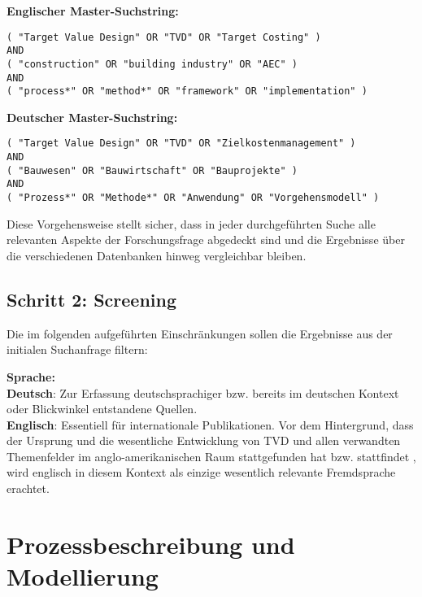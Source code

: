 \textbf{Englischer Master-Suchstring:}
\begin{verbatim}
( "Target Value Design" OR "TVD" OR "Target Costing" )
AND
( "construction" OR "building industry" OR "AEC" )
AND
( "process*" OR "method*" OR "framework" OR "implementation" )
\end{verbatim}

\textbf{Deutscher Master-Suchstring:}
\begin{verbatim}
( "Target Value Design" OR "TVD" OR "Zielkostenmanagement" )
AND
( "Bauwesen" OR "Bauwirtschaft" OR "Bauprojekte" )
AND
( "Prozess*" OR "Methode*" OR "Anwendung" OR "Vorgehensmodell" )
\end{verbatim}

Diese Vorgehensweise stellt sicher, dass in jeder durchgeführten Suche alle relevanten Aspekte der Forschungsfrage abgedeckt sind und die Ergebnisse über die verschiedenen Datenbanken hinweg vergleichbar bleiben.

\FloatBarrier

\subsection{Schritt 2: Screening}
Die im folgenden aufgeführten Einschränkungen sollen die Ergebnisse aus der initialen Suchanfrage filtern:

\textbf{Sprache:} \\
\textbf{Deutsch}: Zur Erfassung deutschsprachiger bzw. bereits im deutschen Kontext oder Blickwinkel entstandene Quellen.\\
\textbf{Englisch}: Essentiell für internationale Publikationen. Vor dem Hintergrund, dass der Ursprung und die wesentliche Entwicklung von \ac{TVD} und allen verwandten Themenfelder im anglo-amerikanischen Raum stattgefunden hat bzw. stattfindet \autocite{Quelle bzw. Verweis erforderlich?}, wird englisch in diesem Kontext als einzige wesentlich relevante Fremdsprache erachtet.\\


\FloatBarrier
\clearpage

\section{Prozessbeschreibung und Modellierung}
\label{sec: 3.3}

